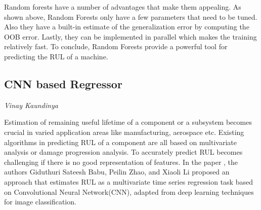 Random forests have a number of advantages that make them appealing. As shown above, Random Forests only have a few parameters that need to be tuned. Also they have a built-in estimate of the generalization error by computing the OOB error. Lastly, they can be implemented in parallel which makes the training relatively fast. To conclude, Random Forests provide a powerful tool for predicting the RUL of a machine.

\subsection{CNN based Regressor}
\vspace*{-12.5mm}\hfill{\normalsize\emph{Vinay Kaundinya}}
\label{sec:rul_estimation:approaches:cnn_rul}

Estimation of remaining useful lifetime of a component or a subsystem becomes crucial in varied application areas like manufacturing, aerospace etc. Existing algorithms in predicting RUL of a component are all based on multivariate analysis or damage progression analysis. To accurately predict RUL becomes challenging if there is no good representation of features. In the paper \cite{DBLP:conf/dasfaa/BabuZL16}, the authors Giduthuri Sateesh Babu, Peilin Zhao, and Xiaoli Li  proposed an approach that estimates RUL as a multivariate time series regression task based on Convolutional Neural Network(CNN), adapted from deep learning techniques for image classification.

